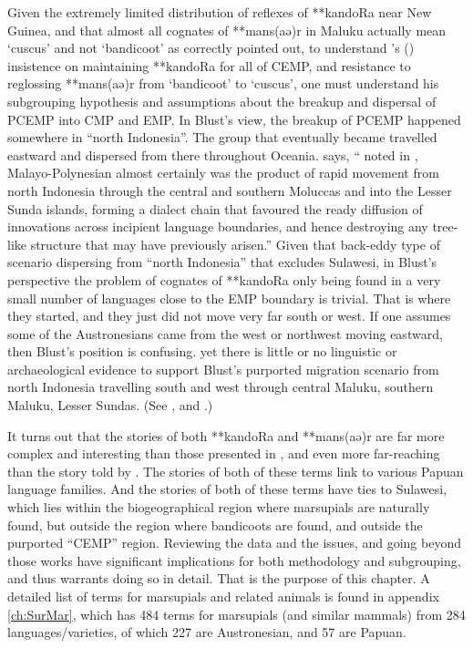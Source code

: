 Given the extremely limited distribution of reflexes of **kandoRa
near New Guinea, and that almost all cognates of **mans(aə)r in Maluku actually
mean ‘cuscus’ and not ‘bandicoot’ as \citet{Schapper2011} correctly pointed
out, to understand \citeauthor{Blust2012b}'s (\citeyear{Blust2012b}) insistence on maintaining **kandoRa
for all of CEMP,
and resistance to reglossing **mans(aə)r from ‘bandicoot’ to
‘cuscus’, one must understand his subgrouping hypothesis
and assumptions about the breakup
and dispersal of PCEMP into CMP and EMP.
In Blust's view, the breakup of PCEMP happened somewhere in “north Indonesia”.
The group that eventually became  travelled eastward
and dispersed from there throughout Oceania.
\citet[98]{Blust2008} says, “ noted in \citet{Blust1993},
 Malayo-Polynesian almost certainly was the product of
rapid movement from north Indonesia through the central
and southern Moluccas and into the Lesser Sunda islands,
forming a dialect chain that favoured the ready diffusion of
innovations across incipient language boundaries,
and hence destroying any tree-like structure that may have previously
arisen.” 
Given that back-eddy type of scenario dispersing from ``north
Indonesia'' that excludes Sulawesi,
in Blust's perspective the problem of cognates of **kandoRa only
being found in a very small number of languages close to the
EMP boundary is trivial.
That is where they started,
and they just did not move very far south or west.
If one assumes some of the Austronesians came from the west or
northwest moving eastward, then Blust's position is confusing.
 yet there is little or no linguistic or archaeological evidence
to support Blust’s purported migration scenario from north
Indonesia travelling south and west through central Maluku,
southern Maluku, Lesser Sundas.
(See , and \citealp[4]{Bellwood2019b}.)

It turns out that the stories of both **kandoRa
and **mans(aə)r are far more complex
and interesting than those presented in \citet{Blust1982,Blust2012b},
and even more far-reaching than the story told by \citet{Schapper2011}.
The stories of both of these terms link to various Papuan language families.
And the stories of both of these terms have ties to Sulawesi,
which lies within the biogeographical region where marsupials
are naturally found, but outside the region where bandicoots are found,
and outside the purported “CEMP” region.
Reviewing the data and the issues, and going beyond those works
have significant implications for both methodology
and subgrouping, and thus warrants doing so in detail.
That is the purpose of this chapter.
A detailed list of terms for marsupials
and related animals is found in appendix \ref{ch:SurMar},
which has 484 terms for marsupials
(and similar mammals) from 284 languages/varieties,
of which 227 are Austronesian,
and 57 are Papuan.

